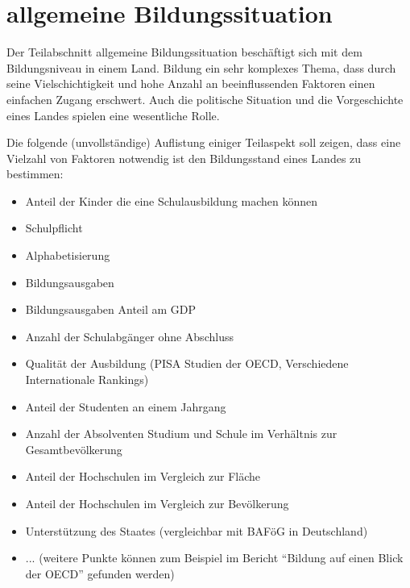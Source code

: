 \section{allgemeine Bildungssituation}
Der Teilabschnitt allgemeine Bildungssituation beschäftigt sich mit dem Bildungsniveau in einem Land. Bildung ein sehr komplexes Thema, dass durch seine Vielschichtigkeit und hohe Anzahl an beeinflussenden Faktoren einen einfachen Zugang erschwert. Auch die politische Situation und die Vorgeschichte eines Landes spielen eine wesentliche Rolle.

Die folgende (unvollständige) Auflistung einiger Teilaspekt soll zeigen, dass eine Vielzahl von Faktoren notwendig ist den Bildungsstand eines Landes zu bestimmen:
\begin{itemize} 
\item Anteil der Kinder die eine Schulausbildung machen können
\item Schulpflicht
\item Alphabetisierung
\item Bildungsausgaben
\item Bildungsausgaben Anteil am GDP
\item Anzahl der Schulabgänger ohne Abschluss
\item Qualität der Ausbildung (PISA Studien der OECD, Verschiedene Internationale Rankings)
\item Anteil der Studenten an einem Jahrgang
\item Anzahl der Absolventen Studium und Schule im Verhältnis zur Gesamtbevölkerung
\item Anteil der Hochschulen im Vergleich zur Fläche
\item Anteil der Hochschulen im Vergleich zur Bevölkerung
\item Unterstützung des Staates (vergleichbar mit BAFöG in Deutschland)
\item ... (weitere Punkte können zum Beispiel im Bericht ``Bildung auf einen Blick der OECD'' gefunden werden)
\end{itemize}

